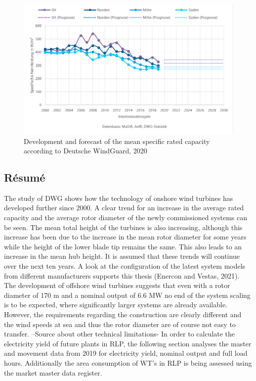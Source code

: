 \documentclass[a4paper,11pt]{article}
\begin{document}
\begin{figure}[H]

{\centering \includegraphics[width=1\linewidth]{figures/DWG/DWG_Spezifische_Nennleistung} 

}

\caption{Development and forecast of the mean specific rated capacity according to Deutsche WindGuard, 2020}\label{fig:spec}
\end{figure}
\hypertarget{ruxe9sumuxe9}{%
\subsection{Résumé}\label{ruxe9sumuxe9}}

The study of DWG shows how the technology of onshore wind turbines has developed further since 2000. A clear trend for an increase in the average rated capacity and the average rotor diameter of the newly commissioned systems can be seen. The mean total height of the turbines is also increasing, although this increase has been due to the increase in the mean rotor diameter for some years while the height of the lower blade tip remains the same. This also leads to an increase in the mean hub height. It is assumed that these trends will continue over the next ten years. A look at the configuration of the latest system models from different manufacturers supports this thesis (Enercon and Vestas, 2021). The development of offshore wind turbines suggests that even with a rotor diameter of 170 m and a nominal output of 6.6 MW no end of the system scaling is to be expected, where significantly larger systems are already available. However, the requirements regarding the construction are clearly different and the wind speeds at sea and thus the rotor diameter are of course not easy to transfer. --Source about other technical limitations-
In order to calculate the electricity yield of future plants in RLP, the following section analyses the master and movement data from 2019 for electricity yield, nominal output and full load hours. Additionally the area consumption of WT's in RLP is being assessed using the market master data register.
\end{document}
